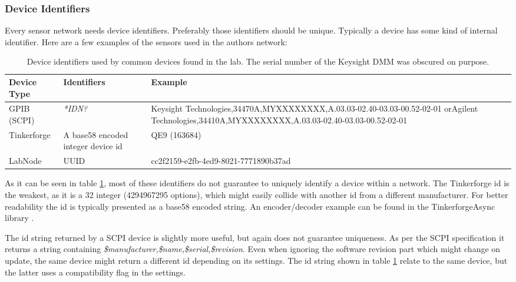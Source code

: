 \subsubsection{Device Identifiers}
Every sensor network needs device identifiers. Preferably those identifiers should be unique. Typically a device has some kind of internal identifier. Here are a few examples of the sensors used in the authors network:
\begin{table}[ht]
    \centering
    \begin{tabularx}{0.95\textwidth}{|l|p{3cm}|X|}
        \hline
        Device Type& Identifiers& Example\\
        \hline
        GPIB (SCPI)& \textit{*IDN?}& \small{Keysight Technologies,34470A,MYXXXXXXXX,A.03.03-02.40-03.03-00.52-02-01} or\newline\small{Agilent Technologies,34410A,MYXXXXXXXX,A.03.03-02.40-03.03-00.52-02-01}\\
        \hline
        Tinkerforge& A base58 encoded integer device id& QE9 (163684)\\
        \hline
        LabNode& UUID & cc2f2159-e2fb-4ed9-8021-7771890b37ad\\
        \hline
    \end{tabularx}
    \caption{Device identifiers used by common devices found in the lab. The serial number of the Keysight  DMM was obscured on purpose.}
    \label{tab:common_device_ids}
\end{table}

As it can be seen in table \ref{tab:common_device_ids}, most of these identifiers do not guarantee to uniquely identify a device within a network. The Tinkerforge id is the weakest, as it is a \qty{32}{\bit} integer (\num{4294967295} options), which might easily collide with another id from a different manufacturer. For better readability the id is typically presented as a base58 encoded string. An encoder/decoder example can be found in the TinkerforgeAsync library \cite{TinkerforgeAsync}.

The id string returned by a SCPI device is slightly more useful, but again does not guarantee uniqueness. As per the SCPI specification it returns a string containing \textit{\$manufacturer,\$name,\$serial,\$revision}. Even when ignoring the software revision part which might change on update, the same device might return a different id depending on its settings. The id string shown in table \ref{tab:common_device_ids} relate to the same device, but the latter uses a compatibility flag in the settings.

